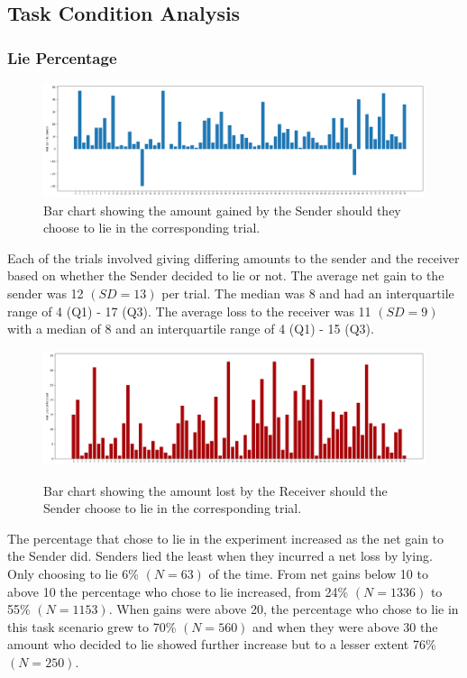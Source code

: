 \documentclass[man, floatsintext]{apa7}
\begin{document}
\subsection{Task Condition Analysis}

\subsubsection{Lie Percentage}

\begin{figure}[H]
	\includegraphics[width=\linewidth]{../plots/TrialIndex/Gains.png}
	\caption{Bar chart showing the amount gained by the Sender should they choose to lie in the corresponding trial.}
	\label{fig:Gains}
\end{figure}

Each of the trials involved giving differing amounts to the sender and the receiver based on whether the Sender decided to lie or not. The average net gain to the sender was 12 $(SD = 13)$ per trial. The median was 8 and had an interquartile range of 4 (Q1) - 17 (Q3). The average loss to the receiver was 11 $(SD = 9)$ with a median of 8 and an interquartile range of 4 (Q1) - 15 (Q3).

\begin{figure}[H]
	\caption{Bar chart showing the amount lost by the Receiver should the Sender choose to lie in the corresponding trial.}
	\includegraphics[width=\linewidth]{../plots/TrialIndex/Losses.png}
	\label{fig:Losses}
\end{figure}

The percentage that chose to lie in the experiment increased as the net gain to the Sender did.  Senders lied the least when they incurred a net loss by lying. Only choosing to lie 6\% $(N = 63)$ of the time. From net gains below 10 to above 10 the percentage who chose to lie increased, from 24\% $(N = 1336)$ to 55\% $(N = 1153)$. When gains were above 20, the percentage who chose to lie in this task scenario grew to 70\% $(N = 560)$ and when they were above 30 the amount who decided to lie showed further increase but to a lesser extent 76\% $(N = 250)$.
\end{document}
